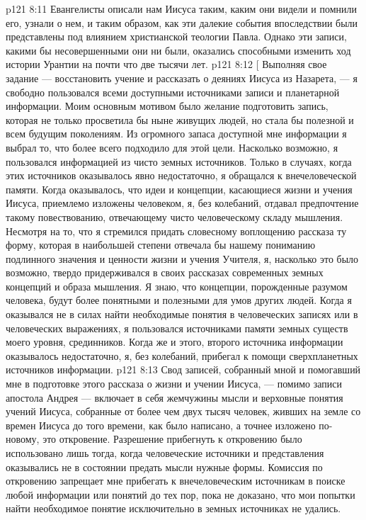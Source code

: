 \vs p121 8:11 \pc Евангелисты описали нам Иисуса таким, каким они видели и помнили его, узнали о нем, и таким образом, как эти далекие события впоследствии были представлены под влиянием христианской теологии Павла. Однако эти записи, какими бы несовершенными они ни были, оказались способными изменить ход истории Урантии на почти что две тысячи лет.
\vsetoff
\vs p121 8:12 [ Выполняя свое задание --- восстановить учение и рассказать о деяниях Иисуса из Назарета, --- я свободно пользовался всеми доступными источниками записи и планетарной информации. Моим основным мотивом было желание подготовить запись, которая не только просветила бы ныне живущих людей, но стала бы полезной и всем будущим поколениям. Из огромного запаса доступной мне информации я выбрал то, что более всего подходило для этой цели. Насколько возможно, я пользовался информацией из чисто земных источников. Только в случаях, когда этих источников оказывалось явно недостаточно, я обращался к внечеловеческой памяти. Когда оказывалось, что идеи и концепции, касающиеся жизни и учения Иисуса, приемлемо изложены человеком, я, без колебаний, отдавал предпочтение такому повествованию, отвечающему чисто человеческому складу мышления. Несмотря на то, что я стремился придать словесному воплощению рассказа ту форму, которая в наибольшей степени отвечала бы нашему пониманию подлинного значения и ценности жизни и учения Учителя, я, насколько это было возможно, твердо придерживался в своих рассказах современных земных концепций и образа мышления. Я знаю, что концепции, порожденные разумом человека, будут более понятными и полезными для умов других людей. Когда я оказывался не в силах найти необходимые понятия в человеческих записях или в человеческих выражениях, я пользовался источниками памяти земных существ моего уровня, срединников. Когда же и этого, второго источника информации оказывалось недостаточно, я, без колебаний, прибегал к помощи сверхпланетных источников информации.
\vs p121 8:13 Свод записей, собранный мной и помогавший мне в подготовке этого рассказа о жизни и учении Иисуса, --- помимо записи апостола Андрея --- включает в себя жемчужины мысли и верховные понятия учений Иисуса, собранные от более чем двух тысяч человек, живших на земле со времен Иисуса до того времени, как было написано, а точнее изложено по\hyp{}новому, это откровение. Разрешение прибегнуть к откровению было использовано лишь тогда, когда человеческие источники и представления оказывались не в состоянии предать мысли нужные формы. Комиссия по откровению запрещает мне прибегать к внечеловеческим источникам в поиске любой информации или понятий до тех пор, пока не доказано, что мои попытки найти необходимое понятие исключительно в земных источниках не удались.
